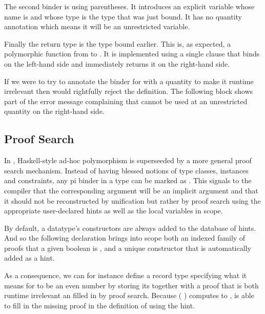 The second binder is using parentheses. It introduces an explicit variable whose name
is  and whose type is the type  that was just bound. It has
no quantity annotation which means it will be an unrestricted variable.

Finally the return type is the type  bound earlier. This is, as expected,
a polymorphic function from  to . It is implemented using
a single clause that binds  on the left-hand side and immediately returns
it on the right-hand side.


If we were to try to annotate the binder for  with a 
quantity to make it runtime irrelevant then \idris{} would
rightfully reject the definition.
%
The following  block shows part of the error message complaining
that  cannot be used at an unrestricted quantity on the right-hand side.




\subsection{Proof Search}\label{sec:proofsearch}

In \idris{}, Haskell-style ad-hoc polymorphism is superseeded by a more general
proof search mechanism.
%
Instead of having blessed notions of type classes, instances and constraints, any
pi binder in a type can be marked as .
%
This signals to the compiler that the corresponding argument will be an implicit
argument and that it should not be reconstructed by unification but rather by
proof search using the appropriate user-declared hints as well as the local
variables in scope.

By default, a datatype's constructors are always added to the database of hints.
And so the following declaration brings into scope both an indexed family
 of proofs that a given boolean is , and a unique
constructor  that is automatically added as a hint.


As a consequence, we can for instance define a record type specifying what it
means for  to be an even number by storing its 
together with a proof that is both runtime irrelevant an filled in by proof search.
%
Because ( \IdrisFunction{*}  \IdrisFunction{==} )
computes to , \idris{} is able to fill in the missing proof in the
definition of  using the  hint.

